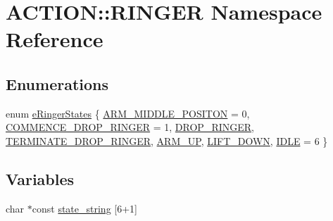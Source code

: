 \hypertarget{namespace_a_c_t_i_o_n_1_1_r_i_n_g_e_r}{
\section{\-A\-C\-T\-I\-O\-N\-:\-:\-R\-I\-N\-G\-E\-R \-Namespace \-Reference}
\label{namespace_a_c_t_i_o_n_1_1_r_i_n_g_e_r}
}
\subsection*{\-Enumerations}
\begin{DoxyCompactItemize}
\item 
enum \hyperlink{namespace_a_c_t_i_o_n_1_1_r_i_n_g_e_r_ab667be2b08eb6ff2fb0a50199ea7546e}{e\-Ringer\-States} \{ \*
\hyperlink{namespace_a_c_t_i_o_n_1_1_r_i_n_g_e_r_ab667be2b08eb6ff2fb0a50199ea7546eaba1d568926b6d4f7f56f71b14fa5cd99}{\-A\-R\-M\-\_\-\-M\-I\-D\-D\-L\-E\-\_\-\-P\-O\-S\-I\-T\-O\-N} =  0, 
\hyperlink{namespace_a_c_t_i_o_n_1_1_r_i_n_g_e_r_ab667be2b08eb6ff2fb0a50199ea7546ea3c2503063d91756ee7603fc383a0ce89}{\-C\-O\-M\-M\-E\-N\-C\-E\-\_\-\-D\-R\-O\-P\-\_\-\-R\-I\-N\-G\-E\-R} =  1, 
\hyperlink{namespace_a_c_t_i_o_n_1_1_r_i_n_g_e_r_ab667be2b08eb6ff2fb0a50199ea7546ea3f2be5d854873b7ef269c2810d4fb786}{\-D\-R\-O\-P\-\_\-\-R\-I\-N\-G\-E\-R}, 
\hyperlink{namespace_a_c_t_i_o_n_1_1_r_i_n_g_e_r_ab667be2b08eb6ff2fb0a50199ea7546ea5d07d39ef3685beade3feed91b0cbeec}{\-T\-E\-R\-M\-I\-N\-A\-T\-E\-\_\-\-D\-R\-O\-P\-\_\-\-R\-I\-N\-G\-E\-R}, 
\*
\hyperlink{namespace_a_c_t_i_o_n_1_1_r_i_n_g_e_r_ab667be2b08eb6ff2fb0a50199ea7546ea2c6cd16cef4d14c0c3c4a3135f1098e9}{\-A\-R\-M\-\_\-\-U\-P}, 
\hyperlink{namespace_a_c_t_i_o_n_1_1_r_i_n_g_e_r_ab667be2b08eb6ff2fb0a50199ea7546ea6ea99735d217b8c411861643ec886745}{\-L\-I\-F\-T\-\_\-\-D\-O\-W\-N}, 
\hyperlink{namespace_a_c_t_i_o_n_1_1_r_i_n_g_e_r_ab667be2b08eb6ff2fb0a50199ea7546eafc22bd0892b3b5f4aa69e10811d250e2}{\-I\-D\-L\-E} =  6
 \}
\end{DoxyCompactItemize}
\subsection*{\-Variables}
\begin{DoxyCompactItemize}
\item 
char $\ast$const \hyperlink{namespace_a_c_t_i_o_n_1_1_r_i_n_g_e_r_ae79f10e95a6cba81113a3d2bdb009d83}{state\-\_\-string} \mbox{[}6+1\mbox{]}
\end{DoxyCompactItemize}


